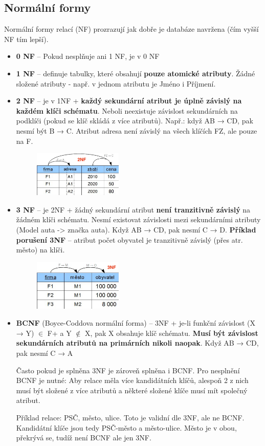 \subsection{Normální formy}
Normální formy relací (NF) prozrazují jak dobře je databáze navržena (čím vyšší NF tím lepší).
\begin{itemize}
\item \textbf{0 NF} -- Pokud nesplňuje ani 1 NF, je v 0 NF
\item \textbf{1 NF} -- definuje tabulky, které obsahují \textbf{pouze atomické atributy}. Žádné složené atributy - např. v jednom atributu je Jméno i Příjmení.
\item \textbf{2 NF} -- je v 1NF + \textbf{každý sekundární atribut je úplně závislý na každém klíči schématu}. Neboli neexistuje závislost sekundárních na podklíči (pokud se klíč skládá z více atributů). Např.: když AB → CD, pak nesmí být B → C. Atribut adresa není závislý na všech klíčích FZ, ale pouze na F.
\begin{figure}[H]
	\centering
	\includegraphics[width=0.4\textwidth]{assets/2nf.png}
\end{figure}
\item \textbf{3 NF} -- je 2NF + žádný sekundární atribut \textbf{není tranzitivně závislý} na žádném klíči schématu. Nesmí existovat závislosti mezi sekundárními atributy (Model auta -> značka auta). Když AB → CD, pak nesmí C  → D. \textbf{Příklad porušení 3NF} -- atribut počet obyvatel je tranzitivně závislý (přes atr. město) na klíči.
\begin{figure}[H]
	\centering
	\includegraphics[width=0.4\textwidth]{assets/3nf.png}
\end{figure}
\item \textbf{BCNF} (Boyce-Coddova normální forma) -- 3NF + je-li funkční závislost (X → Y) $\in$ F+ a Y $\notin$ X, pak X obsahuje klíč schématu. \textbf{Musí být závislost sekundárních atributů na primárních nikoli naopak}. Když AB → CD, pak nesmí C  → A  

Často pokud je splněna 3NF je zároveň splněna i BCNF. Pro nesplnění BCNF je nutné: Aby relace měla více kandidátních klíčů, alespoň 2 z nich musí být složené z více atributů a některé složené klíče musí mít společný atribut.

Příklad relace: PSČ, město, ulice. Toto je validní dle 3NF, ale ne BCNF. Kandidátní klíče jsou tedy PSČ-město a město-ulice. Město je v obou, překrývá se, tudíž není BCNF ale jen 3NF.
\end{itemize}